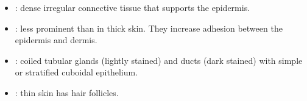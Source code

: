 \begin{multicols}{2}
\begin{itemize}
  \begin{center}
  \end{center}
  
  \item {}:  dense irregular connective tissue that supports the epidermis. 
  
  \begin{center}
  \end{center}
  
  \item {}: less prominent than in thick skin. They increase adhesion between the epidermis and dermis.
  
  \begin{center}
  \end{center}
  
  \item {}: coiled tubular glands (lightly stained) and ducts (dark stained) with simple or stratified cuboidal epithelium.
  
  \begin{center}
  \end{center}
  
  \item {}:  thin skin has hair follicles.
  
  \begin{center}
  \end{center}
  
\end{itemize}
\end{multicols}

